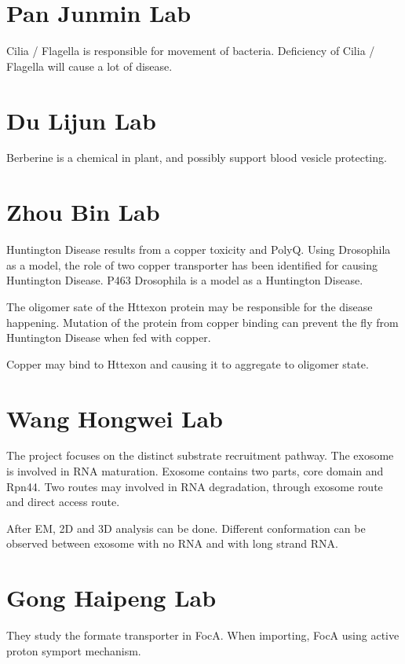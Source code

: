 \documentclass[11pt, oneside]{article}   	%
\begin{document}
\section{Pan Junmin Lab}
	\par
	Cilia / Flagella is responsible for movement of bacteria. Deficiency of Cilia / Flagella will cause a lot of disease. 
	\par
\section{Du Lijun Lab}
	\par
	Berberine is a chemical in plant, and possibly support blood vesicle protecting.
	\par
\section{Zhou Bin Lab}
	\par
	Huntington Disease results from a copper toxicity and PolyQ. Using Drosophila as a model, the role of two copper transporter has been identified for causing Huntington Disease. P463 Drosophila is a model as a Huntington Disease.
	\par
	The oligomer sate of the Httexon protein may be responsible for the disease happening. Mutation of the protein from copper binding can prevent the fly from Huntington Disease when fed with copper.
	\par
	Copper may bind to Httexon and causing it to aggregate to oligomer state.
\section{Wang Hongwei Lab}
	\par
	The project focuses on the distinct substrate recruitment pathway. The exosome is  involved in RNA maturation. Exosome contains two parts, core domain and Rpn44. Two routes may involved in RNA degradation, through exosome route and direct access route.
	\par
	After EM, 2D and 3D analysis can be done. Different conformation can be observed between exosome with no RNA and with long strand RNA.
	\par
\section{Gong Haipeng Lab}
	\par
	They study the formate transporter in FocA. When importing, FocA using active proton symport mechanism.
	\par
\end{document}
